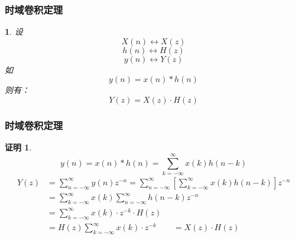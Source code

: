 \documentclass[notheorems,compress,mathserif,table]{beamer}
\newtheorem{dablock}{}
\newtheorem{daproof}{证明}
\begin{document}
\begin{frame}\frametitle{时域卷积定理}%
\begin{dablock}
设
$$X(n)\leftrightarrow X(z)$$
$$h(n)\leftrightarrow H(z)$$
$$y(n)\leftrightarrow Y(z)$$
如$$y(n) = x(n)*h(n)$$
则有：
$$Y(z) = X(z)\cdot H(z)$$
\end{dablock}

\end{frame}



\begin{frame}[shrink]\frametitle{时域卷积定理}%


\begin{daproof}
$$ y(n)      = x(n)*h(n) = \sum_{k=-\infty}^{\infty}x(k)h(n-k) $$
\begin{equation*}
\begin{split}
Y(z)      &= \sum_{n=-\infty}^{\infty}y(n)z^{-n}
=\sum_{n=-\infty}^{\infty}\left[\sum_{k=-\infty}^{\infty}x(k)h(n-k)\right]z^{-n} \\
&= \sum_{k=-\infty}^{\infty}x(k)\sum_{n=-\infty}^{\infty}h(n-k)z^{-n}\\
&= \sum_{k=-\infty}^{\infty}x(k)\cdot z^{-k}\cdot H(z) \\
&= H(z) \sum_{k=-\infty}^{\infty}x(k)\cdot z^{-k}\quad\quad  = X(z)\cdot H(z)
\end{split}
\end{equation*}
\end{daproof}

\end{frame}
\end{document}
